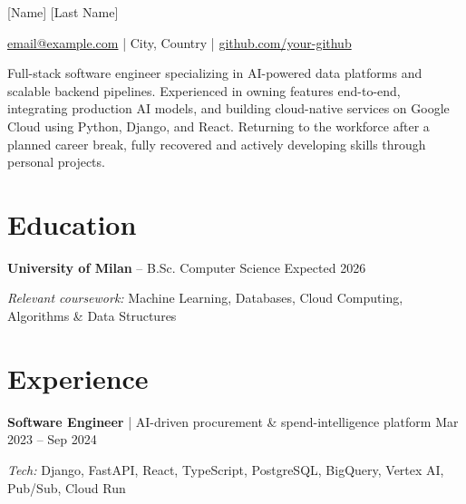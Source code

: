 \documentclass[11pt]{article}
\begin{document}

\centerline{\Huge [Name] [Last Name]}

\vspace{4pt}

\centerline{
\href{mailto:email@example.com}{email@example.com}
\;|\;
City, Country
\;|\;
\href{https://github.com/your-github}{github.com/your-github}
}
\vspace{4pt}


Full-stack software engineer specializing in AI-powered data platforms and scalable backend pipelines. Experienced in owning features end-to-end, integrating production AI models, and building cloud-native services on Google Cloud using Python, Django, and React. Returning to the workforce after a planned career break, fully recovered and actively developing skills through personal projects.

\vspace{-8pt}


\section*{Education}
\textbf{University of Milan} -- B.Sc. Computer Science \hfill Expected 2026

\textit{Relevant coursework:} Machine Learning, Databases, Cloud Computing, Algorithms \& Data Structures

\vspace{-8pt}


\section*{Experience}

\textbf{Software Engineer} | AI-driven procurement \& spend-intelligence platform
\hfill
Mar 2023 -- Sep 2024

\textit{Tech:} Django, FastAPI, React, TypeScript, PostgreSQL, BigQuery, Vertex AI, Pub/Sub, Cloud Run
\end{document}
